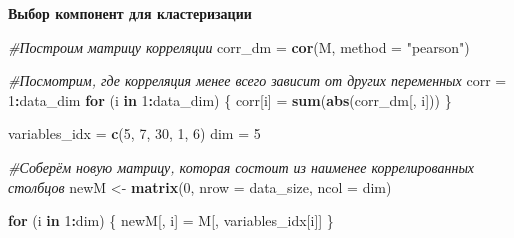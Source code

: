 \documentclass[
]{article}
\newenvironment{Shaded}{\begin{snugshade}}{\end{snugshade}}
\newcommand{\CommentTok}[1]{\textcolor[rgb]{0.56,0.35,0.01}{\textit{#1}}}
\newcommand{\ControlFlowTok}[1]{\textcolor[rgb]{0.13,0.29,0.53}{\textbf{#1}}}
\newcommand{\DataTypeTok}[1]{\textcolor[rgb]{0.13,0.29,0.53}{#1}}
\newcommand{\DecValTok}[1]{\textcolor[rgb]{0.00,0.00,0.81}{#1}}
\newcommand{\KeywordTok}[1]{\textcolor[rgb]{0.13,0.29,0.53}{\textbf{#1}}}
\newcommand{\NormalTok}[1]{#1}
\newcommand{\OperatorTok}[1]{\textcolor[rgb]{0.81,0.36,0.00}{\textbf{#1}}}
\newcommand{\OtherTok}[1]{\textcolor[rgb]{0.56,0.35,0.01}{#1}}
\newcommand{\StringTok}[1]{\textcolor[rgb]{0.31,0.60,0.02}{#1}}
\begin{document}
\begin{Shaded}
\end{Shaded}

\textbf{Выбор компонент для кластеризации}

\begin{Shaded}
\begin{Highlighting}[]
\CommentTok{#Построим матрицу корреляции}
\NormalTok{corr_dm =}\StringTok{ }\KeywordTok{cor}\NormalTok{(M, }\DataTypeTok{method =} \StringTok{"pearson"}\NormalTok{)}

\CommentTok{#Посмотрим, где корреляция менее всего зависит от других переменных}
\NormalTok{corr =}\StringTok{ }\DecValTok{1}\OperatorTok{:}\NormalTok{data_dim}
\ControlFlowTok{for}\NormalTok{ (i }\ControlFlowTok{in} \DecValTok{1}\OperatorTok{:}\NormalTok{data_dim) \{}
\NormalTok{  corr[i] =}\StringTok{ }\KeywordTok{sum}\NormalTok{(}\KeywordTok{abs}\NormalTok{(corr_dm[, i]))}
\NormalTok{\}}

\NormalTok{variables_idx =}\StringTok{ }\KeywordTok{c}\NormalTok{(}\DecValTok{5}\NormalTok{, }\DecValTok{7}\NormalTok{, }\DecValTok{30}\NormalTok{, }\DecValTok{1}\NormalTok{, }\DecValTok{6}\NormalTok{)}
\NormalTok{dim =}\StringTok{ }\DecValTok{5}

 \CommentTok{#Соберём новую матрицу, которая состоит из наименее коррелированных столбцов}
\NormalTok{newM <-}\StringTok{ }\KeywordTok{matrix}\NormalTok{(}\DecValTok{0}\NormalTok{, }\DataTypeTok{nrow =}\NormalTok{ data_size, }\DataTypeTok{ncol =}\NormalTok{ dim)}

\ControlFlowTok{for}\NormalTok{ (i }\ControlFlowTok{in} \DecValTok{1}\OperatorTok{:}\NormalTok{dim) \{}
\NormalTok{  newM[, i] =}\StringTok{ }\NormalTok{M[, variables_idx[i]]}
\NormalTok{\}}
\end{Highlighting}
\end{Shaded}
\end{document}
